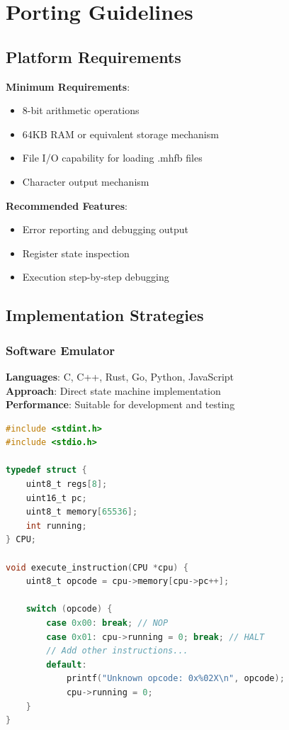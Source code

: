 \documentclass[a4paper,12pt]{article}
\begin{document}
\section{Porting Guidelines}

\subsection{Platform Requirements}
\textbf{Minimum Requirements}:
\begin{itemize}
    \item 8-bit arithmetic operations
    \item 64KB RAM or equivalent storage mechanism
    \item File I/O capability for loading .mhfb files
    \item Character output mechanism
\end{itemize}

\textbf{Recommended Features}:
\begin{itemize}
    \item Error reporting and debugging output
    \item Register state inspection
    \item Execution step-by-step debugging
\end{itemize}

\subsection{Implementation Strategies}

\subsubsection{Software Emulator}
\textbf{Languages}: C, C++, Rust, Go, Python, JavaScript\\
\textbf{Approach}: Direct state machine implementation\\
\textbf{Performance}: Suitable for development and testing

\begin{lstlisting}[language=C, caption=Minimal Emulator Template]
#include <stdint.h>
#include <stdio.h>

typedef struct {
    uint8_t regs[8];
    uint16_t pc;
    uint8_t memory[65536];
    int running;
} CPU;

void execute_instruction(CPU *cpu) {
    uint8_t opcode = cpu->memory[cpu->pc++];
    
    switch (opcode) {
        case 0x00: break; // NOP
        case 0x01: cpu->running = 0; break; // HALT
        // Add other instructions...
        default:
            printf("Unknown opcode: 0x%02X\n", opcode);
            cpu->running = 0;
    }
}
\end{lstlisting}
\end{document}
